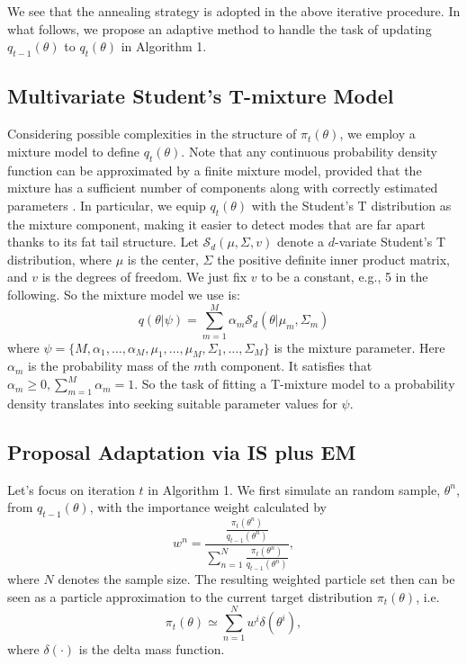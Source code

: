 We see that the annealing strategy is adopted in the above iterative
procedure. In what follows, we propose an adaptive method to handle
the task of updating $q_{t-1}(\theta)$ to $q_{t}(\theta)$ in
Algorithm 1.

\subsection{Multivariate Student's T-mixture Model}
Considering possible complexities in the structure of
$\pi_t(\theta)$, we employ a mixture model to define
$q_{t}(\theta)$. Note that any continuous probability density
function can be approximated by a finite mixture model, provided
that the mixture has a sufficient number of components along with
correctly estimated parameters
\citep{bishop2005neural,zeevi1997det}. In particular, we equip
$q_{t}(\theta)$ with the Student's T distribution as the mixture
component, making it easier to detect modes that are far apart
thanks to its fat tail structure. Let $\mathcal{S}_d(\mu,\Sigma,v)$
denote a $d$-variate Student's T distribution, where $\mu$ is the
center, $\Sigma$ the positive definite inner product matrix, and $v$
is the degrees of freedom. We just fix $v$ to be a constant, e.g., 5
in the following. So the mixture model we use is:
\begin{equation}\label{Definition_mixture}
q(\theta|\psi)=\sum\limits_{m=1}^M \alpha_{m}
\mathcal{S}_d(\theta|\mu_m,\Sigma_m)
\end{equation}
where
$\psi=\{M,\alpha_1,\ldots,\alpha_M,\mu_1,\ldots,\mu_M,\Sigma_1,\ldots,\Sigma_M\}$
is the mixture parameter. Here $\alpha_m$ is the probability mass of
the $m$th component. It satisfies that $\alpha_{m}\geq
0,\sum_{m=1}^M \alpha_{m}=1$. So the task of fitting a T-mixture
model to a probability density translates into seeking suitable
parameter values for $\psi$.

\subsection {Proposal Adaptation via IS plus EM}\label{sec:IS_EM}
Let's focus on iteration $t$ in Algorithm 1. We first simulate an
random sample, $\theta^n$, from $q_{t-1}(\theta)$, with the
importance weight calculated by
\begin{equation}
w^n=\frac{\frac{\pi_{t}(\theta^n)}{q_{t-1}(\theta^n)}}{\sum_{n=1}^N\frac{\pi_{t}(\theta^n)}{q_{t-1}(\theta^n)}},
\end{equation}
where $N$ denotes the sample size. The resulting weighted particle
set then can be seen as a particle approximation to the current
target distribution $\pi_t(\theta)$, i.e.
\begin{equation}\label{delta_mass_approx}
\pi_t(\theta)\simeq\sum\limits_{n=1}^Nw^i\delta(\theta^i),
\end{equation}
where $\delta(\cdot)$ is the delta mass function.

